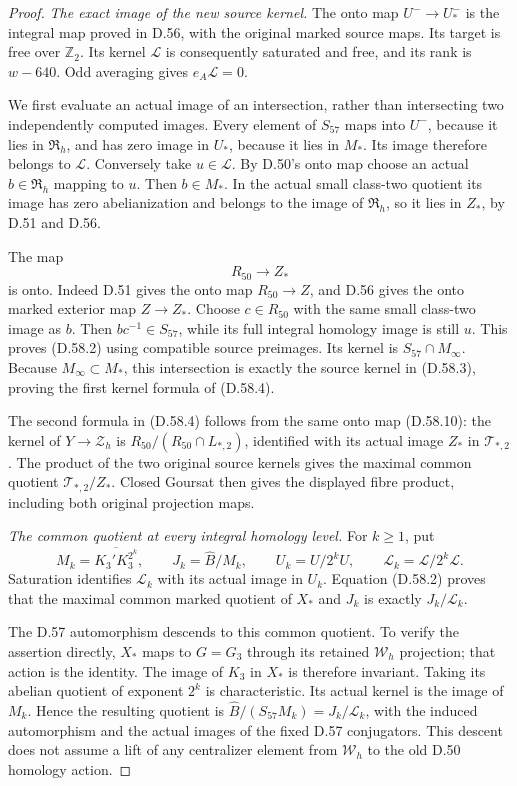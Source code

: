 \begin{proof}
\emph{The exact image of the new source kernel.}
The onto map \(U^-\to U_*^-\) is the integral map
proved in D.56, with the original marked source maps.
Its target is free over \(\mathbb Z_2\). Its kernel
\(\mathcal L\) is consequently saturated and free,
and its rank is \(w-640\). Odd averaging gives
\(e_A\mathcal L=0\).

We first evaluate an actual image of an intersection,
rather than intersecting two independently computed
images. Every element of \(S_{57}\) maps into
\(U^-\), because it lies in \(\mathfrak R_h\), and
has zero image in \(U_*\), because it lies in \(M_*\).
Its image therefore belongs to \(\mathcal L\).
Conversely take \(u\in\mathcal L\). By D.50's onto
map choose an actual \(b\in\mathfrak R_h\) mapping
to \(u\). Then \(b\in M_*\). In the actual small
class-two quotient its image has zero abelianization
and belongs to the image of \(\mathfrak R_h\), so
it lies in \(Z_*\), by D.51 and D.56.

The map
\[
                 R_{50}\longrightarrow Z_*
 \tag{D.58.10}
\]
is onto. Indeed D.51 gives the onto map
\(R_{50}\to Z\), and D.56 gives the onto marked
exterior map \(Z\to Z_*\). Choose \(c\in R_{50}\)
with the same small class-two image as \(b\).
Then \(bc^{-1}\in S_{57}\), while its full integral
homology image is still \(u\). This proves (D.58.2)
using compatible source preimages.
Its kernel is \(S_{57}\cap M_\infty\).
Because \(M_\infty\subset M_*\), this intersection
is exactly the source kernel in (D.58.3), proving
the first kernel formula of (D.58.4).

The second formula in (D.58.4) follows from the same
onto map (D.58.10): the kernel of \(Y\to\mathcal Z_h\)
is \(R_{50}/(R_{50}\cap L_{*,2})\), identified with
its actual image \(Z_*\) in \(\mathcal T_{*,2}\).
The product of the two original source kernels gives
the maximal common quotient \(\mathcal T_{*,2}/Z_*\).
Closed Goursat then gives the displayed fibre product,
including both original projection maps.

\emph{The common quotient at every integral homology level.}
For \(k\geq1\), put
\[
 M_k=\overline{K_3'K_3^{2^k}},\qquad
 J_k=\widehat B/M_k,\qquad
 U_k=U/2^kU,\qquad
 \mathcal L_k=\mathcal L/2^k\mathcal L.
 \tag{D.58.11}
\]
Saturation identifies \(\mathcal L_k\) with its
actual image in \(U_k\). Equation (D.58.2) proves
that the maximal common marked quotient of \(X_*\)
and \(J_k\) is exactly \(J_k/\mathcal L_k\).

The D.57 automorphism descends to this common quotient.
To verify the assertion directly, \(X_*\) maps to
\(G=G_3\) through its retained \(\mathcal W_h\)
projection; that action is the identity. The image
of \(K_3\) in \(X_*\) is therefore invariant.
Taking its abelian quotient of exponent \(2^k\)
is characteristic. Its actual kernel is the image
of \(M_k\). Hence the resulting quotient is
\(\widehat B/(S_{57}M_k)=J_k/\mathcal L_k\), with
the induced automorphism and the actual images
of the fixed D.57 conjugators. This descent does
not assume a lift of any centralizer element from
\(\mathcal W_h\) to the old D.50 homology action.


\end{proof}
